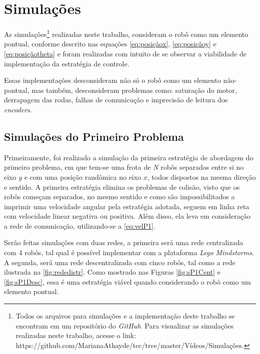 \chapter{Simulações}
\label{chap:Simulacoes}

As simulações\footnote{Todos os arquivos para simulações e a implementação deste trabalho se encontram em um repositório do \emph{GitHub}. Para visualizar as simulações realizadas neste trabalho, acesse o link: https://github.com/MarianaAthayde/tcc/tree/master/Vídeos/Simulações.} realizadas neste trabalho, consideram o robô como um elemento pontual, conforme descrito nas equações \ref{eq:posiçãox}, \ref{eq:posiçãoy} e \ref{eq:posiçãotheta} e foram realizadas com intuito de se observar a viabilidade de implementação da estratégia de controle. 

Essas implementações desconsideram não só o robô como um elemento não-pontual, mas também, desconsideram problemas como: saturação do motor, derrapagem das rodas, falhas de comunicação e imprecisão de leitura dos \emph{encoders}. 

\section{Simulações do Primeiro Problema}
\label{sec:SimulacaoP1}

Primeiramente, foi realizado a simulação da primeira estratégia de abordagem do primeiro problema, em que tem-se uma frota de \emph{N} robôs separados entre si no eixo $y$ e com uma posição randômica no eixo $x$, todos dispostos na mesma direção e sentido. A primeira estratégia elimina os problemas de colisão, visto que os robôs começam separados, no mesmo sentido e como são impossibilitados a imprimir uma velocidade angular pela estratégia adotada, seguem em linha reta com velocidade linear negativa ou positiva. Além disso, ela leva em consideração a rede de comunicação, utilizando-se a \autoref{eq:velP1}. 

Serão feitas simulações com duas redes, a primeira será uma rede centralizada com 4 robôs, tal qual é possível implementar com a plataforma \emph{Lego Mindstorms\textregistered}. A segunda, será uma rede descentralizada com cinco robôs, tal como a rede ilustrada na \autoref{fig:rededistr}. Como mostrado nas Figuras \ref{fig:sP1Cent} e \ref{fig:sP1Desc}, essa é uma estratégia viável quando considerando o robô como um elemento pontual.

